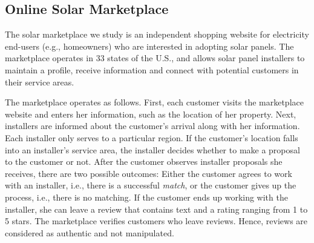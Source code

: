 \documentclass[msom,blindrev]{informs3}
\begin{document}
	
	
	
	
	
	\subsection{Online Solar Marketplace}
	
	The solar marketplace we study is an independent shopping website for electricity end-users (e.g., homeowners) who are interested in adopting solar panels.  The marketplace operates in 33 states of the U.S., and allows solar panel installers to maintain a profile, receive information and connect with potential customers in their service areas.
	
	The marketplace operates as follows. First, each customer visits the marketplace website and enters her information, such as the location of her property. Next, installers are informed about the customer's arrival along with her information.  Each installer only serves to a particular region. If the customer's location falls into an installer's service area, the installer decides whether to make a proposal to the customer or not. After the customer observes installer proposals she receives, there are two possible outcomes: Either the customer agrees to work with an installer, i.e., there is a successful \emph{match}, or the customer gives up the process, i.e., there is no matching. If the customer ends up working with the installer, she can leave a review that contains text and a rating ranging from 1 to 5 stars. The marketplace verifies customers who leave reviews. Hence, reviews are considered as authentic and not manipulated.
\end{document}
